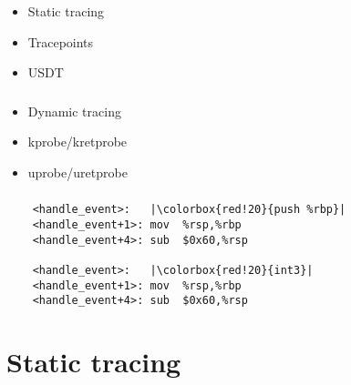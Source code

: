 \documentclass[usenames,dvipsnames, 18pt, compress, aspectratio=169]{beamer}
\begin{document}
\begin{frame}[fragile]{}
    \frametitle{}
    \begin{center}
        \begin{itemize}[label={}]
            \item {Static tracing}
            \item {Tracepoints}
            \item {USDT}
        \end{itemize}
    \end{center}
\end{frame}

\begin{frame}[fragile]{}
    \frametitle{}
    \begin{center}
        \begin{itemize}[label={}]
            \item {Dynamic tracing}
            \item {kprobe/kretprobe}
            \item {uprobe/uretprobe}
        \end{itemize}
    \end{center}
\end{frame}

\begin{frame}[fragile]{}
    \frametitle{}
    \begin{center}
        \begin{verbatim}
    <handle_event>:   |\colorbox{red!20}{push %rbp}|
    <handle_event+1>: mov  %rsp,%rbp
    <handle_event+4>: sub  $0x60,%rsp

    <handle_event>:   |\colorbox{red!20}{int3}|
    <handle_event+1>: mov  %rsp,%rbp
    <handle_event+4>: sub  $0x60,%rsp
        \end{verbatim}

    \end{center}
\end{frame}

\section{Static tracing}
\end{document}
